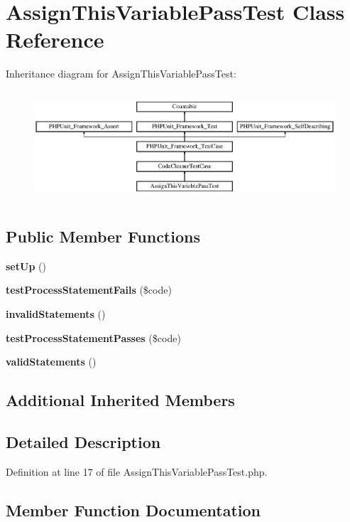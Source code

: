 \section{Assign\+This\+Variable\+Pass\+Test Class Reference}
\label{class_psy_1_1_test_1_1_code_cleaner_1_1_assign_this_variable_pass_test}
Inheritance diagram for Assign\+This\+Variable\+Pass\+Test\+:\begin{figure}[H]
\begin{center}
\leavevmode
\includegraphics[height=4.129793cm]{class_psy_1_1_test_1_1_code_cleaner_1_1_assign_this_variable_pass_test}
\end{center}
\end{figure}
\subsection*{Public Member Functions}
\begin{DoxyCompactItemize}
\item 
{\bf set\+Up} ()
\item 
{\bf test\+Process\+Statement\+Fails} (\$code)
\item 
{\bf invalid\+Statements} ()
\item 
{\bf test\+Process\+Statement\+Passes} (\$code)
\item 
{\bf valid\+Statements} ()
\end{DoxyCompactItemize}
\subsection*{Additional Inherited Members}


\subsection{Detailed Description}


Definition at line 17 of file Assign\+This\+Variable\+Pass\+Test.\+php.



\subsection{Member Function Documentation}
